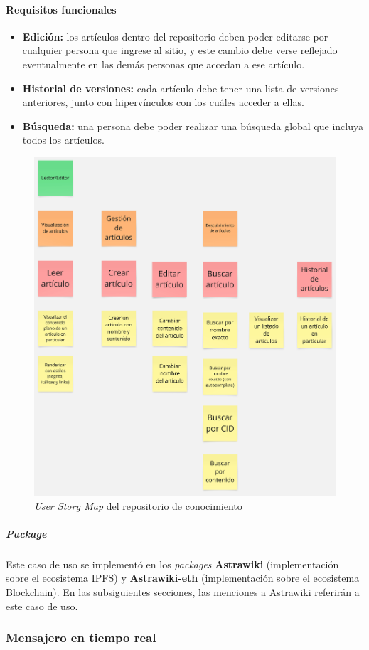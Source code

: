 \paragraph{Requisitos funcionales}

\begin{itemize}
    \item \textbf{Edición:} los artículos dentro del repositorio deben poder editarse por cualquier persona que ingrese al sitio, y este cambio debe verse reflejado eventualmente en las demás personas que accedan a ese artículo.
    \item \textbf{Historial de versiones:} cada artículo debe tener una lista de versiones anteriores, junto con hipervínculos con los cuáles acceder a ellas.
    \item \textbf{Búsqueda:} una persona debe poder realizar una búsqueda global que incluya todos los artículos.
\end{itemize}

\begin{figure}[H]
    \centering
    \includegraphics[width=0.5\linewidth]{img/solucion-wiki/usm-wiki.jpg}
    \caption{\textit{User Story Map} del repositorio de conocimiento}
    \label{fig:usm-wiki}
\end{figure}

\subparagraph{Package}

Este caso de uso se implementó en los \textit{packages} \textbf{Astrawiki} \cite{astrawiki-ipfs} (implementación sobre el ecosistema IPFS) y \textbf{Astrawiki-eth} \cite{astrawiki-eth} (implementación sobre el ecosistema Blockchain). En las subsiguientes secciones, las menciones a Astrawiki referirán a este caso de uso.

\subsubsection{Mensajero en tiempo real}

